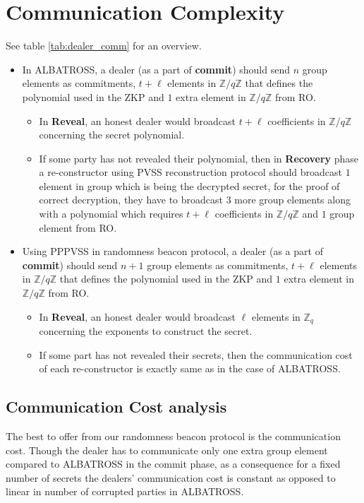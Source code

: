 



\section{Communication Complexity}

See table \ref{tab:dealer_comm} for an overview.
\begin{itemize}
    \item In ALBATROSS, a dealer (as a part of \textbf{commit}) should send $n$ group elements as commitments, $t+\ell$ elements in $\mathbb{Z}/q\mathbb{Z}$ that defines the polynomial used in the ZKP and $1$ extra element in $\mathbb{Z}/q\mathbb{Z}$ from RO. 
    \begin{itemize}
        \item In \textbf{Reveal}, an honest dealer would broadcast $t+\ell$ coefficients in $\mathbb{Z}/q\mathbb{Z}$ concerning the secret polynomial.
        \item If some party has not revealed their polynomial, then in \textbf{Recovery} phase a re-constructor using PVSS reconstruction protocol should broadcast $1$ element in group which is being the decrypted secret, for the proof of correct decryption, they have to broadcast $3$ more group elements along with a polynomial which requires $t+\ell$ coefficients in $\mathbb{Z}/q\mathbb{Z}$ and $1$ group element from RO.
    \end{itemize}
    \item Using PPPVSS in randomness beacon protocol, a dealer (as a part of \textbf{commit}) should send $n+1$ group elements as commitments, $t+\ell$ elements in $\mathbb{Z}/q\mathbb{Z}$ that defines the polynomial used in the ZKP and $1$ extra element in $\mathbb{Z}/q\mathbb{Z}$ from RO.
    \begin{itemize}
        \item In \textbf{Reveal}, an honest dealer would broadcast $\ell$ elements in $\mathbb{Z}_q$ concerning the exponents to construct the secret.
        \item If some part has not revealed their secrets, then the communication cost of each re-constructor is exactly same as in the case of ALBATROSS.
    \end{itemize}
\end{itemize}

\subsection{Communication Cost analysis}
The best to offer from our randomness beacon protocol is the communication cost. Though the dealer has to communicate only 
one extra group element compared to ALBATROSS in the commit phase, as a consequence for a fixed number of secrets the 
dealers' communication cost is constant as opposed to linear in number of corrupted parties in ALBATROSS. 

